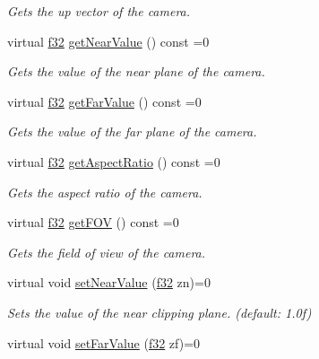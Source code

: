 \begin{DoxyCompactItemize}
\begin{DoxyCompactList}\small\item\em Gets the up vector of the camera. \end{DoxyCompactList}\item 
virtual \hyperlink{namespaceirr_a0277be98d67dc26ff93b1a6a1d086b07}{f32} \hyperlink{classirr_1_1scene_1_1ICameraSceneNode_a4c8e279cc5b5e185b9588472607fcf9d}{get\+Near\+Value} () const  =0
\begin{DoxyCompactList}\small\item\em Gets the value of the near plane of the camera. \end{DoxyCompactList}\item 
virtual \hyperlink{namespaceirr_a0277be98d67dc26ff93b1a6a1d086b07}{f32} \hyperlink{classirr_1_1scene_1_1ICameraSceneNode_aac51884dba5f6167f270bc28a3d93f20}{get\+Far\+Value} () const  =0
\begin{DoxyCompactList}\small\item\em Gets the value of the far plane of the camera. \end{DoxyCompactList}\item 
virtual \hyperlink{namespaceirr_a0277be98d67dc26ff93b1a6a1d086b07}{f32} \hyperlink{classirr_1_1scene_1_1ICameraSceneNode_a65add6131d7a0aadb8668a21b8add647}{get\+Aspect\+Ratio} () const  =0
\begin{DoxyCompactList}\small\item\em Gets the aspect ratio of the camera. \end{DoxyCompactList}\item 
virtual \hyperlink{namespaceirr_a0277be98d67dc26ff93b1a6a1d086b07}{f32} \hyperlink{classirr_1_1scene_1_1ICameraSceneNode_a34dec43859d13ae6b2f8c5446b32e6fa}{get\+F\+OV} () const  =0
\begin{DoxyCompactList}\small\item\em Gets the field of view of the camera. \end{DoxyCompactList}\item 
virtual void \hyperlink{classirr_1_1scene_1_1ICameraSceneNode_aab5107ae5d0373d6fb005a87741e7057}{set\+Near\+Value} (\hyperlink{namespaceirr_a0277be98d67dc26ff93b1a6a1d086b07}{f32} zn)=0
\begin{DoxyCompactList}\small\item\em Sets the value of the near clipping plane. (default\+: 1.\+0f) \end{DoxyCompactList}\item 
virtual void \hyperlink{classirr_1_1scene_1_1ICameraSceneNode_ab7e427dd639b6bb63f648d6d087da1ea}{set\+Far\+Value} (\hyperlink{namespaceirr_a0277be98d67dc26ff93b1a6a1d086b07}{f32} zf)=0

\end{DoxyCompactItemize}
